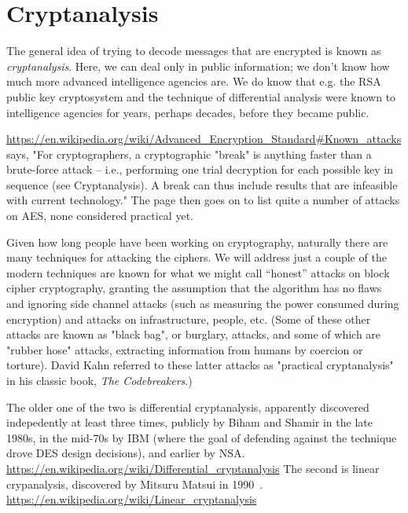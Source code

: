 \section{Cryptanalysis}
\label{sec:cryptan}


The general idea of trying to decode messages that are encrypted is
known as \emph{cryptanalysis}.  Here, we can deal only in public information;
we don't know how much more advanced intelligence agencies are.  We do
know that e.g. the RSA public key cryptosystem and the technique of
differential analysis were known to intelligence agencies for years,
perhaps decades, before they became public. 

\url{https://en.wikipedia.org/wiki/Advanced_Encryption_Standard#Known_attacks}
says, "For cryptographers, a cryptographic "break" is anything faster
than a brute-force attack – i.e., performing one trial decryption for
each possible key in sequence (see Cryptanalysis). A break can thus
include results that are infeasible with current technology."
The page then goes on to list quite a number of attacks on AES, none
considered practical yet.

Given how long people have been working on cryptography, naturally
there are many techniques for attacking the ciphers.  We will address
just a couple of the modern techniques are known for what we might
call ``honest'' attacks on block cipher cryptography, granting the
assumption that the algorithm has no flaws and ignoring side channel
attacks (such as measuring the power consumed during encryption) and
attacks on infrastructure, people, etc.  (Some of these other attacks
are known as "black bag", or burglary, attacks, and some of which are
"rubber hose" attacks, extracting information from humans by coercion
or torture).  David Kahn referred to these latter attacks as
"practical cryptanalysis" in his classic book, \emph{The
  Codebreakers}.)

The older one of the two is differential cryptanalysis, apparently
discovered indepedently at least three times, publicly by Biham and
Shamir in the late 1980s, in the mid-70s by IBM (where the goal of
defending against the technique drove DES design decisions), and
earlier by NSA.
\url{https://en.wikipedia.org/wiki/Differential_cryptanalysis}
The second is linear crypanalysis, discovered by Mitsuru Matsui in
1990~\cite{matsui1993linear}.
\url{https://en.wikipedia.org/wiki/Linear_cryptanalysis}

